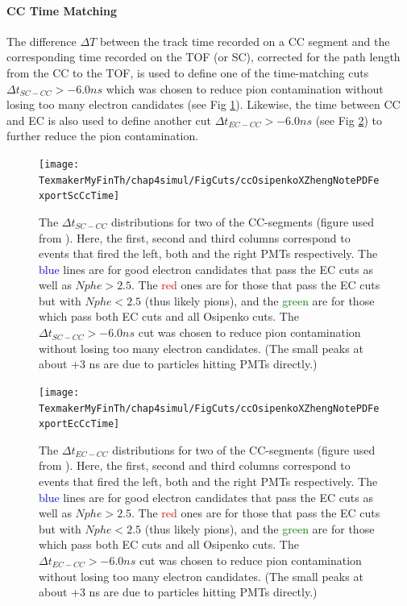 \paragraph{CC Time Matching}
The difference $\Delta T$ between the track time recorded on a CC segment and the corresponding time recorded on the TOF (or SC), corrected for the path length from the CC to the TOF, is used to define one of the time-matching cuts $\Delta t_{SC - CC} > - 6.0 ns$ which was chosen to reduce pion contamination without losing too many electron candidates (see Fig \ref{scCcTime}). Likewise, the time between CC and EC is also used to define another cut $\Delta t_{EC - CC} > - 6.0 ns$ (see Fig \ref{ecCcTime}) to further reduce the pion contamination.

\begin{figure}[H] %
\centering
\leavevmode \texttt{[image: TexmakerMyFinTh/chap4simul/FigCuts/ccOsipenkoXZhengNotePDFexportScCcTime]}  
\caption[SC - CC Time]{The $\Delta t_{SC - CC}$ distributions for two of the CC-segments (figure used from \cite{anaNoteXZheng}). Here, the first, second and third columns correspond to events that fired the left, both and the right PMTs respectively. The \textcolor{blue}{blue} lines are for good electron candidates that pass the EC cuts as well as $Nphe > 2.5$. The \textcolor{red}{red} ones are for those that pass the EC cuts but with $Nphe < 2.5$ (thus likely pions), and the \textcolor{green}{green} are for those which pass both EC cuts and all Osipenko cuts. The $\Delta t_{SC - CC} > - 6.0 ns$ cut was chosen to reduce pion contamination without losing too many electron candidates. (The small peaks at about +3 ns are due to particles hitting PMTs directly.)}
\label{scCcTime}
\end{figure}

\begin{figure}[H] %
\centering
\leavevmode \texttt{[image: TexmakerMyFinTh/chap4simul/FigCuts/ccOsipenkoXZhengNotePDFexportEcCcTime]}  
\caption[EC - CC Time]{The $\Delta t_{EC - CC}$ distributions for two of the CC-segments (figure used from \cite{anaNoteXZheng}). Here, the first, second and third columns correspond to events that fired the left, both and the right PMTs respectively. The \textcolor{blue}{blue} lines are for good electron candidates that pass the EC cuts as well as $Nphe > 2.5$. The \textcolor{red}{red} ones are for those that pass the EC cuts but with $Nphe < 2.5$ (thus likely pions), and the \textcolor{green}{green} are for those which pass both EC cuts and all Osipenko cuts. The $\Delta t_{EC - CC} > - 6.0 ns$ cut was chosen to reduce pion contamination without losing too many electron candidates. (The small peaks at about +3 ns are due to particles hitting PMTs directly.)}
\label{ecCcTime}
\end{figure}




